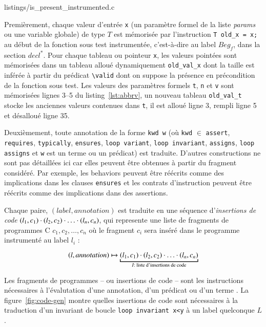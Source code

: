 
                {listings/is_present_instrumented.c}


Premièrement, chaque valeur d'entrée \lstinline'x' (un paramètre formel de la
liste \textit{params} ou une variable globale) de type $T$ est mémorisée par
l'instruction \lstinline|T old_x = x;| au début de la fonction sous test
instrumentée, c'est-à-dire au label $Beg_f$, dans la section $decl^{*}$.
Pour chaque tableau ou pointeur \lstinline'x', les valeurs pointées sont
mémorisées dans un tableau alloué dynamiquement \lstinline'old_val_x' dont la
taille est inférée à partir du prédicat \lstinline'\valid' dont on suppose la
présence en précondition de la fonction sous test.
Les valeurs des paramètres formels \lstinline|t|, \lstinline|n| et \lstinline|v|
sont mémorisées lignes 3--5 du listing~\ref{lst:abbrv}, un nouveau tableau
\lstinline|old_val_t| stocke les anciennes valeurs contenues dans \lstinline|t|,
il est alloué ligne 3, rempli ligne 5 et désalloué ligne 35.

Deuxièmement, toute annotation \eacsl de la forme \lstinline'kwd w' (où
\lstinline'kwd' $\in$ \bopen \lstinline|assert|, \lstinline|requires|,
\lstinline|typically|, \lstinline|ensures|, \lstinline|loop variant|,
\lstinline|loop invariant|, \lstinline|assigns|, \lstinline|loop assigns|
\bclose et \lstinline'w' est un terme ou un prédicat) est traduite.
D'autres constructions \eacsl ne sont pas détaillées ici car elles peuvent être
obtenues à partir du fragment \eacsl considéré.
Par exemple, les behaviors peuvent être réécrits comme des implications dans les
clauses \lstinline'ensures' et les contrats d'instruction peuvent être réécrits
comme des implications dans des assertions.

Chaque paire, $(label, annotation)$ est traduite en une séquence
d'\emph{insertions de code}
$(l_1, c_1) \cdot (l_2, c_2) \cdot \ldots \cdot (l_n, c_n)$, qui 
represente une liste de fragments de programmes C $c_1, c_2, \ldots, c_n$ où
le fragment $c_i$ sera inséré dans le programme instrumenté au label $l_i$ :

\[
(l, annotation) \rulearrow \underbracket{(l_1, c_1) \concat (l_2, c_2) \concat
  \ldots \concat (l_n, c_n)}_{I : \text{ liste d'insertions de code}}
\]



Les fragments de programmes -- ou insertions de code -- sont les instructions
nécessaires à l'évalutation d'une annotation, d'un prédicat ou d'un terme
\eacsl.
La figure~\ref{fig:code-gen} montre quelles insertions de code sont nécessaires
à la traduction d'un invariant de boucle \lstinline'loop invariant x<y' à un
label quelconque $L$.

